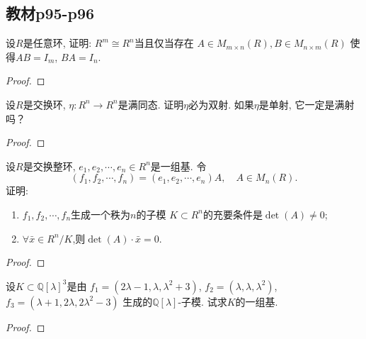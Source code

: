 \subsection{教材p95-p96}

\begin{problem}
    设$R$是任意环, 证明: $R^m \cong R^n$当且仅当存在
$A \in M_{m \times n}(R), B \in M_{n \times m}(R)$
使得$AB = I_m$, $BA = I_{n}$.
\end{problem}

\begin{proof}
    
\end{proof}

\begin{problem}
    设$R$是交换环, $\eta:R^n \to R^n$是满同态.
证明$\eta$必为双射. 如果$\eta$是单射, 它一定是满射吗？
\end{problem}

\begin{proof}
    
\end{proof}

\begin{problem}
    设$R$是交换整环, $e_1, e_2, \cdots, e_n \in R^n$是一组基.
令
\[
    (f_1, f_2, \cdots, f_n) = (e_1, e_2, \cdots, e_n)A,\quad A \in M_n(R).
\]
证明:
\begin{enumerate}[(1)]
    \item $f_1, f_2, \cdots, f_n$生成一个秩为$n$的子模
$K \subset R^n$的充要条件是$\det(A) \neq 0$;
    \item $\forall \bar{x} \in R^{n}/K$,则$\det(A) \cdot \bar{x} = 0$.
\end{enumerate}
\end{problem}

\begin{proof}
    
\end{proof}

\begin{problem}
    设$K \subset \mathbb{Q}[\lambda]^3$是由
$f_1 = (2\lambda - 1, \lambda, \lambda^2 + 3)$,
$f_2 = (\lambda, \lambda, \lambda^2)$,
$f_3 = (\lambda + 1, 2\lambda, 2\lambda^2 - 3)$
生成的$\mathbb{Q}[\lambda]$-子模. 试求$K$的一组基.
\end{problem}

\begin{proof}
    
\end{proof}

